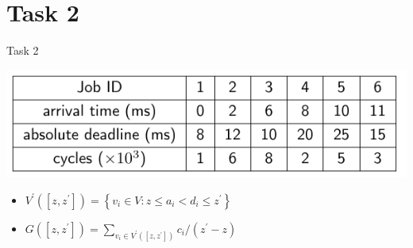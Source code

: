 
\section{Task 2}

\setcounter{task}{1}

\begin{frame}[allowframebreaks]{Task 2}{}
  \begin{tasknoinc}
    \centering
    \includegraphics[width=0.8\paperheight]{./figures/task2.png}
  \end{tasknoinc}
  \begin{requirements}
    \begin{itemize}
      \item $V^{\prime}\left(\left[z, z^{\prime}\right]\right)=\left\{v_i \in V: z \leq a_i<d_i \leq z^{\prime}\right\}$
      \item $G\left(\left[z, z^{\prime}\right]\right)=\sum_{v_i \in V^{\prime}\left(\left[z, z^{\prime}\right]\right)} c_i /\left(z^{\prime}-z\right)$
    \end{itemize}
  \end{requirements}
\end{frame}

